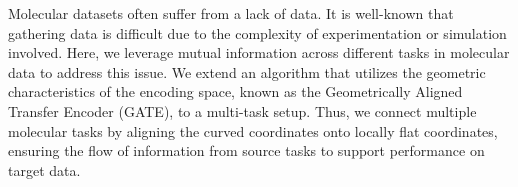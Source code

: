 Molecular datasets often suffer from a lack of data. It is well-known that gathering data is difficult due to the complexity of experimentation or simulation involved. Here, we leverage mutual information across different tasks in molecular data to address this issue. We extend an algorithm that utilizes the geometric characteristics of the encoding space, known as the Geometrically Aligned Transfer Encoder (GATE), to a multi-task setup. Thus, we connect multiple molecular tasks by aligning the curved coordinates onto locally flat coordinates, ensuring the flow of information from source tasks to support performance on target data.